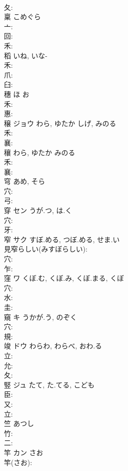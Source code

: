 \documentclass[8pt]{extreport}
\begin{document}
\begin{CJK}{UTF8}{min}
\\	夂: 
\\	稟		こめぐら				
\\	亠: 
\\	回: 
\\	禾: 
\\	稻		いね, いな-				
\\	禾: 
\\	爪: 
\\	臼: 
\\	穗		ほ	お			
\\	禾: 
\\	惠: 
\\	穣	ジョウ	わら, ゆたか	しげ, みのる	
\\	禾: 
\\	襄: 
\\	穰		わら, ゆたか	みのる			
\\	禾: 
\\	襄: 
\\	穹		あめ, そら				
\\	穴: 
\\	弓: 
\\	穿	セン	うが.つ, は.く		
\\	穴: 
\\	牙: 
\\	窄	サク	すぼ.める, つぼ.める, せま.い		
\\	見窄らしい(みすぼらしい): 
\\	穴: 
\\	乍: 
\\	窪	ワ	くぼ.む, くぼ.み, くぼ.まる, くぼ		
\\	穴: 
\\	水: 
\\	圭: 
\\	窺	キ	うかが.う, のぞく		
\\	穴: 
\\	規: 
\\	竣	ドウ	わらわ, わらべ, おわ.る		
\\	立: 
\\	允: 
\\	夂: 
\\	竪	ジュ	たて, た.てる, こども		
\\	臣: 
\\	又: 
\\	立: 
\\	竺			あつし			
\\	竹: 
\\	二: 
\\	竿	カン	さお		
\\	竿(さお): 

\end{CJK}
\end{document}
